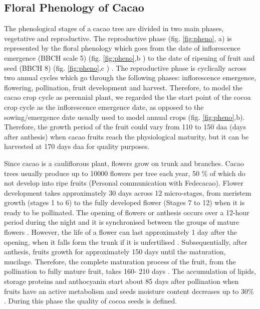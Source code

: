 \documentclass[gene,journal,article,submit,moreauthors,pdftex]{Definitions/mdpi}
\begin{document}
\subsection{Floral Phenology of Cacao}

The phenological stages of a cacao tree are divided in two main phases, vegetative and reproductive. The reproductive phase (fig. \ref{fig:pheno}, a) is represented by the floral phenology which goes from the date of inflorescence emergence (BBCH scale 5) (fig. \ref{fig:pheno},b ) to the date of ripening of fruit and seed (BBCH 8) (fig. \ref{fig:pheno},c ) \citep{Niemenak2010}. The reproductive phase is cyclically across two annual cycles which go through the following phases: inflorescence emergence, flowering, pollination, fruit development and harvest. Therefore, to model the cacao crop cycle as perennial plant, we regarded the the start point of the cocoa crop cycle as the inflorescence emergence date, as opposed to the sowing/emergence date usually used to model annual crops (fig. \ref{fig:pheno},b). Therefore, the growth period of the fruit could vary from 110 to 150 daa (days after anthesis) \citep{lopez2018} when cacao fruits reach the physiological maturity, but it can be harvested at 170 days daa \citep{Niemenak2010} for quality purposes.

Since cacao is a cauliflorous plant, flowers grow on trunk and branches. Cacao trees usually produce up to 10000 flowers per tree each year, 50 \%  of which do not develop into ripe fruits (Personal communication with Fedecacao). Flower development takes approximately 30 days across 12 micro-stages, from meristem growth (stages 1 to 6) to the fully developed flower (Stages 7 to 12) \citep{swanson2005, lopez2018} when it is ready to be pollinated. The opening of flowers or anthesis  occurs over a 12-hour period during the night and it is synchronised between the groups of mature flowers \citep{Niemenak2010}. However, the life of a flower can last approximately 1 day after the opening, when it falls form the trunk if it is unfertilised \citep{cheesman1927, Niemenak2010}. Subsequentially, after anthesis, fruits growth for approximately 150 days until the maturation, mucilage. Therefore, the complete maturation process of the fruit, from the pollination to fully mature fruit, takes 160- 210 days \citep{berry1994}. The accumulation of lipids, storage proteins and anthocyanin start about 85 days after pollination when fruits have an active metabolism and seeds moisture content decreases up to 30\% \citep{Lehrian1980, Niemenak2010}. During this phase the quality of cocoa seeds is defined.
\end{document}
